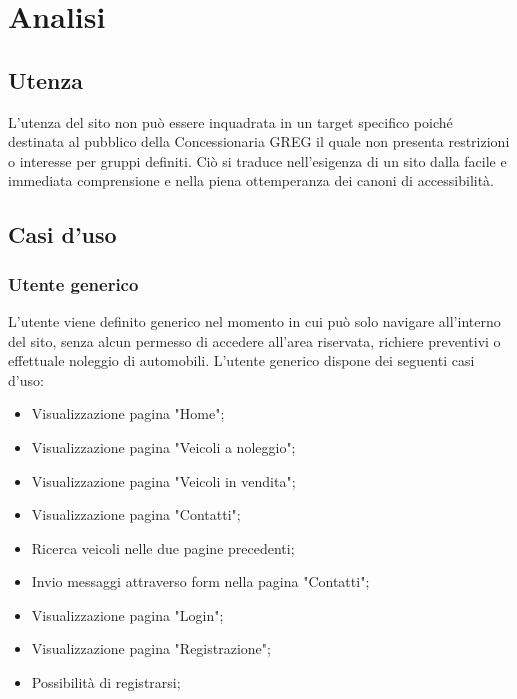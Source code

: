 \section{Analisi}

    \subsection{Utenza}
        L'utenza del sito non può essere inquadrata in un target specifico poiché destinata al pubblico della Concessionaria GREG il quale non presenta restrizioni o interesse per gruppi definiti. Ciò si traduce nell'esigenza di un sito dalla facile e immediata comprensione e nella piena ottemperanza dei canoni di accessibilità.

    \subsection{Casi d'uso}

        \subsubsection{Utente generico}
        L’utente viene definito generico nel momento in cui può solo navigare all’interno del sito, senza alcun permesso di accedere all’area riservata, richiere preventivi o effettuale noleggio di automobili.
        L’utente generico dispone dei seguenti casi d’uso:
        \begin{itemize}
            \item Visualizzazione pagina "Home";
            \item Visualizzazione pagina "Veicoli a noleggio";
            \item Visualizzazione pagina "Veicoli in vendita";
            \item Visualizzazione pagina "Contatti";
            \item Ricerca veicoli nelle due pagine precedenti;
            \item Invio messaggi attraverso form nella pagina "Contatti";
            \item Visualizzazione pagina "Login";
            \item Visualizzazione pagina "Registrazione";
            \item Possibilità di registrarsi;
        \end{itemize}

